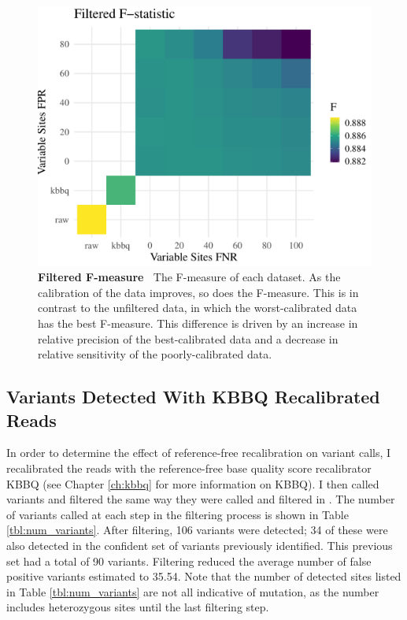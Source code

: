 \documentclass{report}
\newcommand{\titlecaption}[2]{\caption[#1]{\textbf{#1 \textbar\,} #2}}
\begin{document}
\begin{figure}
\centering
\includegraphics[width=.7\linewidth]{flt_f_heatmap.pdf}
\titlecaption{Filtered F-measure}{The F-measure of each dataset. As the calibration of the data improves, so does the F-measure. This is in contrast to the unfiltered data, in which the worst-calibrated data has the best F-measure. This difference is driven by an increase in relative precision of the best-calibrated data and a decrease in relative sensitivity of the poorly-calibrated data.}
\label{fig:vc_flt_f}
\end{figure}


\subsection{Variants Detected With KBBQ Recalibrated Reads}

In order to determine the effect of reference-free recalibration on variant calls, I recalibrated the reads with the reference-free base quality score recalibrator KBBQ (see Chapter \ref{ch:kbbq} for more information on KBBQ). I then called variants and filtered the same way they were called and filtered in \cite{orr_phylogenomic_2020}. The number of variants called at each step in the filtering process is shown in Table \ref{tbl:num_variants}. After filtering, 106 variants were detected; 34 of these were also detected in the confident set of variants previously identified. This previous set had a total of 90 variants. Filtering reduced the average number of false positive variants estimated to 35.54. Note that the number of detected sites listed in Table \ref{tbl:num_variants} are not all indicative of mutation, as the number includes heterozygous sites until the last filtering step.
\end{document}
